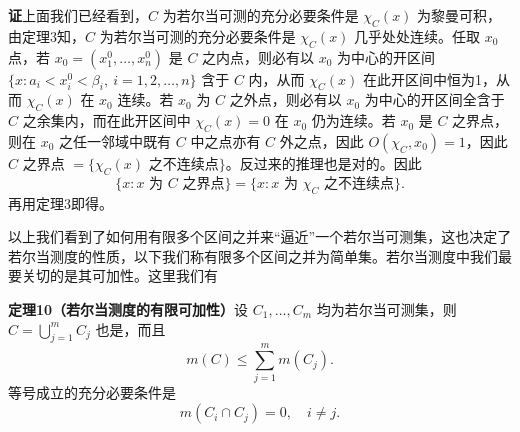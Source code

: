 \noindent\textbf{证}\quad 上面我们已经看到，$C$ 为若尔当可测的充分必要条件是 $\chi_C(x)$ 为黎曼可积，由定理3知，$C$ 为若尔当可测的充分必要条件是 $\chi_C(x)$ 几乎处处连续。任取 $x_0$ 点，若 $x_0=(x_1^0,\ldots,x_n^0)$ 是 $C$ 之内点，则必有以 $x_0$ 为中心的开区间 $\{x:a_i<x_i^0<\beta_i,\ i=1,2,\ldots,n\}$ 含于 $C$ 内，从而 $\chi_C(x)$ 在此开区间中恒为1，从而 $\chi_C(x)$ 在 $x_0$ 连续。若 $x_0$ 为 $C$ 之外点，则必有以 $x_0$ 为中心的开区间全含于 $C$ 之余集内，而在此开区间中 $\chi_C(x)=0$ 在 $x_0$ 仍为连续。若 $x_0$ 是 $C$ 之界点，则在 $x_0$ 之任一邻域中既有 $C$ 中之点亦有 $C$ 外之点，因此 $O(\chi_C,x_0)=1$，因此 $C$ 之界点 $=\{\chi_C(x)\text{ 之不连续点}\}$。反过来的推理也是对的。因此
\[
 \{x:x\text{ 为 }C\text{ 之界点}\}=\{x:x\text{ 为 }\chi_C\text{ 之不连续点}\}.
\]
再用定理3即得。

以上我们看到了如何用有限多个区间之并来“逼近”一个若尔当可测集，这也决定了若尔当测度的性质，以下我们称有限多个区间之并为简单集。若尔当测度中我们最要关切的是其可加性。这里我们有

\noindent\textbf{定理10（若尔当测度的有限可加性）}\quad 设 $C_1,\ldots,C_m$ 均为若尔当可测集，则 $C=\bigcup_{j=1}^{m}C_j$ 也是，而且
\begin{equation}
 m(C)\le\sum_{j=1}^{m}m(C_j).
 \tag{19}
\end{equation}
等号成立的充分必要条件是
\begin{equation}
 m(C_i\cap C_j)=0,\quad i\ne j.
 \tag{20}
\end{equation}

